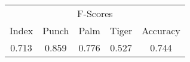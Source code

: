 \documentclass{standalone}
\begin{document}
 
 \begin{tabular}{|c|c|c|c ||c|}
\cline{1-5}\multicolumn{5}{|c|}{F-Scores} \\ 
\cline{1-5}Index & Punch & Palm & Tiger & Accuracy\\ 
\cline{1-5}0.713 & 0.859 & 0.776 & 0.527 & 0.744\\ 
 \cline{1-5}\hline \end{tabular}
 
\end{document}
